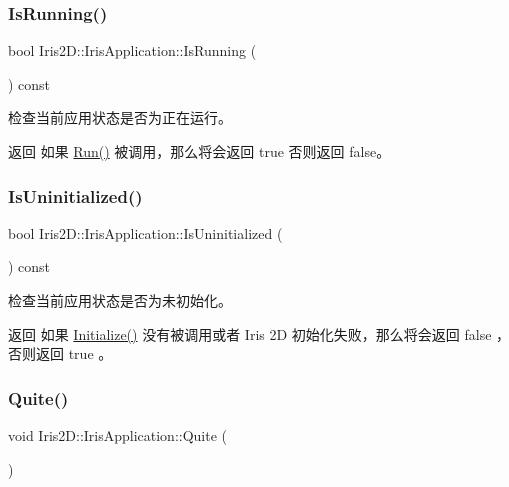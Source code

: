\subsubsection{\texorpdfstring{Is\+Running()}{IsRunning()}}
{\footnotesize\ttfamily bool Iris2\+D\+::\+Iris\+Application\+::\+Is\+Running (\begin{DoxyParamCaption}{ }\end{DoxyParamCaption}) const}



检查当前应用状态是否为正在运行。 

\begin{DoxyReturn}{返回}
如果 \hyperlink{class_iris2_d_1_1_iris_application_ae6bb59365978c945201fd8cf82105e4f}{Run()} 被调用，那么将会返回 true 否则返回 false。 
\end{DoxyReturn}
\mbox{\label{class_iris2_d_1_1_iris_application_a1035e03a186b934ecf57371e42475eea}} 
\subsubsection{\texorpdfstring{Is\+Uninitialized()}{IsUninitialized()}}
{\footnotesize\ttfamily bool Iris2\+D\+::\+Iris\+Application\+::\+Is\+Uninitialized (\begin{DoxyParamCaption}{ }\end{DoxyParamCaption}) const}



检查当前应用状态是否为未初始化。 

\begin{DoxyReturn}{返回}
如果 \hyperlink{class_iris2_d_1_1_iris_application_a84f3ddebb3a3ffb0c172bd41fb952e1a}{Initialize()} 没有被调用或者 Iris 2D 初始化失败，那么将会返回 false ，否则返回 true 。 
\end{DoxyReturn}
\mbox{\label{class_iris2_d_1_1_iris_application_adca8cada1a8841c3f409e856f6878331}} 
\subsubsection{\texorpdfstring{Quite()}{Quite()}}
{\footnotesize\ttfamily void Iris2\+D\+::\+Iris\+Application\+::\+Quite (\begin{DoxyParamCaption}{ }\end{DoxyParamCaption})}



